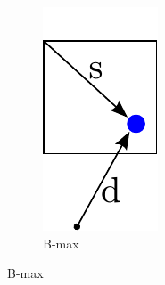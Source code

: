 \begin{figure}
    \hspace{0.75cm}
    \begin{subfigure}{0.15\columnwidth}
        \centering
        \includegraphics[width=\textwidth]{figures/mac_3}
        \caption{B-max}
        \label{fig:tree:mac:3}
    \end{subfigure}

\end{figure}
